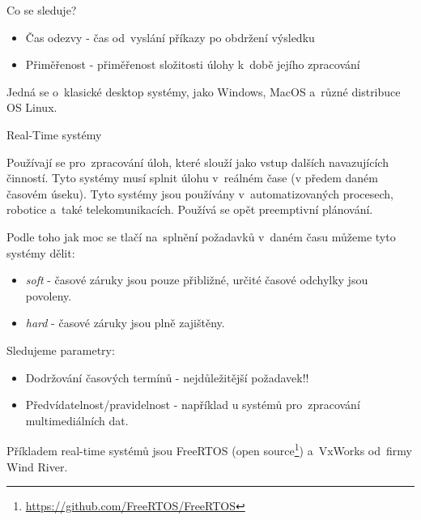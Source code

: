 \vspace{0,5cm}
Co se sleduje?
\begin{itemize}
    \item Čas odezvy - čas od~vyslání příkazy po obdržení výsledku
    \item Přiměřenost - přiměřenost složitosti úlohy k~době jejího zpracování
\end{itemize}

\vspace{0,5cm}

Jedná se o~klasické desktop systémy, jako Windows, MacOS a~různé distribuce OS Linux. 

\begin{large}
    \vspace{0,5cm}
    Real-Time systémy
\end{large}

Používají se pro~zpracování úloh, které slouží jako vstup dalších navazujících činností. Tyto systémy musí splnit úlohu v~reálném čase (v předem daném časovém úseku). Tyto systémy jsou používány v~automatizovaných procesech, robotice a~také telekomunikacích. Používá se opět preemptivní plánování. 

\vspace{0,5cm}

Podle toho jak moc se tlačí na~splnění požadavků v~daném času můžeme tyto systémy dělit:

\begin{itemize}
    \item \emph{soft} - časové záruky jsou pouze přibližné, určité časové odchylky jsou povoleny.
    \item \emph{hard} - časové záruky jsou plně zajištěny. 
\end{itemize}

\vspace{0,5cm}

Sledujeme parametry:

\begin{itemize}
    \item Dodržování časových termínů - nejdůležitější požadavek!!
    \item Předvídatelnost/pravidelnost - například u systémů pro~zpracování multimediálních dat.
\end{itemize}

\vspace{0,5cm}
Příkladem real-time systémů jsou FreeRTOS (open source\footnote{\url{https://github.com/FreeRTOS/FreeRTOS}}) a~VxWorks od~firmy Wind River. 

